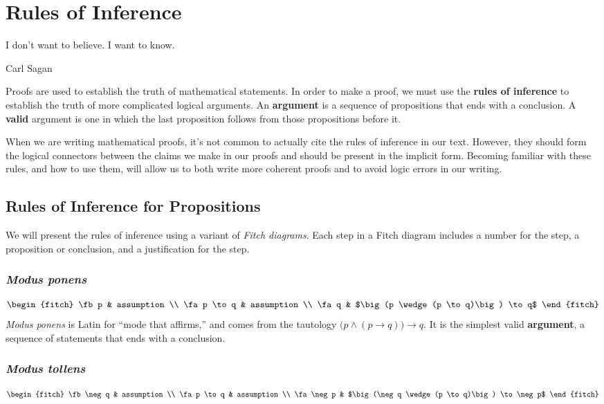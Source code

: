 \chapter{Rules of Inference}
  \epigraph{I don't want to believe. I want to know.}
{Carl Sagan}
Proofs are used to establish the truth of mathematical statements. In order to
make a proof, we must use the \textbf{rules of inference} to establish the truth of more complicated logical arguments. An
\textbf{argument} is a sequence of propositions that ends with a conclusion. A
\textbf{valid} argument is one in which the last proposition follows from those
propositions before it.

When we are writing mathematical proofs, it's not common to actually cite the rules of inference in our text.
However, they should form the logical connectors between the claims we make in our proofs and should be present in the implicit form.
Becoming familiar with these rules, and how to use them, will allow us to both write more coherent proofs and to avoid logic errors in our writing.

\section{Rules of Inference for Propositions}

We will present the rules of inference using a variant of \emph{Fitch diagrams}.
Each step in a Fitch diagram includes a number for the step, a proposition or conclusion,
and a justification for the step.

\subsection{\emph{Modus ponens}}\label{modus_ponens}
\begin{equation*}
  \begin{fitch}
    \fb p       & assumption \\
    \fa p \to q & assumption \\
    \fa  q & $\big(p \wedge (p \to q)\big) \to q$
  \end{fitch}
\end{equation*}
\emph{Modus ponens} is Latin for ``mode that affirms,'' and comes from the
tautology $\big(p \wedge (p \to q)\big) \to q$. It is the simplest valid
\textbf{argument}, a sequence of statements that ends with a conclusion.

\subsection{\emph{Modus tollens}}
\begin{equation*}
  \begin{fitch}
    \fb \neg q  & assumption \\
    \fa p \to q & assumption \\
    \fa \neg p & $\big(\neg q \wedge (p \to q)\big) \to \neg p$
  \end{fitch}
\end{equation*}

